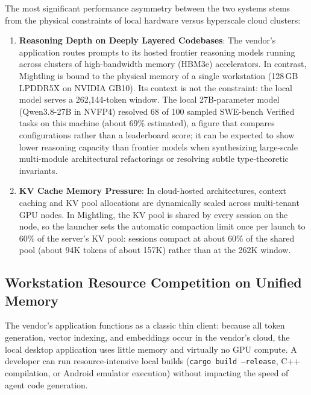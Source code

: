 \documentclass[11pt]{article}
\newcommand{\code}[1]{\texttt{#1}}
\begin{document}
The most significant performance asymmetry between the two systems stems from the physical constraints of local
hardware versus hyperscale cloud clusters:
\begin{enumerate}
    \item \textbf{Reasoning Depth on Deeply Layered Codebases}: The vendor's application routes prompts to its hosted
    frontier reasoning models running across clusters of high-bandwidth memory (HBM3e) accelerators. In contrast,
    Mightling is bound to the physical memory of a single workstation (128\,GB LPDDR5X on NVIDIA GB10). Its context is
    not the constraint: the local model serves a 262,144-token window. The local 27B-parameter model (Qwen3.8-27B in
    NVFP4) resolved 68 of 100 sampled SWE-bench Verified tasks on this machine (about 69\% estimated), a figure that
    compares configurations rather than a leaderboard score; it can be expected to show lower reasoning capacity than
    frontier models when synthesizing large-scale multi-module architectural refactorings or resolving subtle
    type-theoretic invariants.
    \item \textbf{KV Cache Memory Pressure}: In cloud-hosted architectures, context caching and KV pool allocations are
    dynamically scaled across multi-tenant GPU nodes. In Mightling, the KV pool is shared by every session on the node,
    so the launcher sets the automatic compaction limit once per launch to 60\% of the server's KV pool: sessions
    compact at about 60\% of the shared pool (about 94K tokens of about 157K) rather than at the 262K window.
\end{enumerate}

\subsection{Workstation Resource Competition on Unified Memory}

The vendor's application functions as a classic thin client: because all token generation, vector indexing,
and embeddings occur in the vendor's cloud, the local desktop application uses little memory and virtually no GPU
compute. A developer can run resource-intensive local builds (\code{cargo build --release},
C++ compilation, or Android emulator execution) without impacting the speed of agent code generation.
\end{document}
